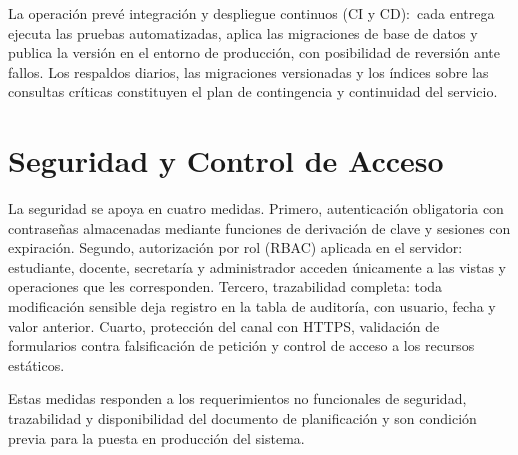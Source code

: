 La operación prevé integración y despliegue continuos (\ac{CI} y \ac{CD}):\ cada
entrega ejecuta las pruebas automatizadas, aplica las migraciones de base de
datos y publica la versión en el entorno de producción, con posibilidad de
reversión ante fallos. Los respaldos diarios, las migraciones versionadas y los
índices sobre las consultas críticas constituyen el plan de contingencia y
continuidad del servicio.

\section{Seguridad y Control de Acceso}
\label{sec:seguridad}

La seguridad se apoya en cuatro medidas. Primero, autenticación obligatoria con
contraseñas almacenadas mediante funciones de derivación de clave y sesiones
con expiración. Segundo, autorización por rol (\ac{RBAC}) aplicada en el
servidor: estudiante, docente, secretaría y administrador acceden únicamente a
las vistas y operaciones que les corresponden. Tercero, trazabilidad completa:
toda modificación sensible deja registro en la tabla de auditoría, con usuario,
fecha y valor anterior. Cuarto, protección del canal con \ac{HTTPS}, validación
de formularios contra falsificación de petición y control de acceso a los
recursos estáticos.

Estas medidas responden a los requerimientos no funcionales de seguridad,
trazabilidad y disponibilidad del documento de planificación y son condición
previa para la puesta en producción del sistema.





